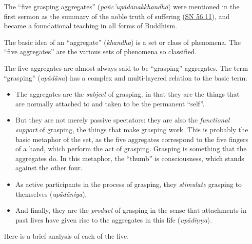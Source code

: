 \documentclass[12pt,openany]{book}%
\begin{document}
The “five grasping aggregates” (\textit{\textsanskrit{pañc}’\textsanskrit{upādānakkhandhā}}) were mentioned in the first sermon as the summary of the noble truth of suffering (\href{https://suttacentral.net/sn56.11}{SN 56.11}), and became a foundational teaching in all forms of Buddhism.

The basic idea of an “aggregate” (\textit{khandha}) is a set or class of phenomena. The “five aggregates” are the various sets of phenomena so classified.

The five aggregates are almost always said to be “grasping” aggregates. The term “grasping” (\textit{\textsanskrit{upādāna}}) has a complex and multi-layered relation to the basic term.

\begin{itemize}%
\item The aggregates are the \emph{subject} of grasping, in that they are the things that are normally attached to and taken to be the permanent “self”.%
\item But they are not merely passive spectators: they are also the \emph{functional support} of grasping, the things that make grasping work. This is probably the basic metaphor of the set, as the five aggregates correspond to the five fingers of a hand, which perform the act of grasping. Grasping is something that the aggregates do. In this metaphor, the “thumb” is consciousness, which stands against the other four.%
\item As active participants in the process of grasping, they \emph{stimulate} grasping to themselves (\textit{\textsanskrit{upādāniya}}).%
\item And finally, they are the \emph{product} of grasping in the sense that attachments in past lives have given rise to the aggregates in this life (\textit{\textsanskrit{upādiṇṇa}}).%
\end{itemize}

Here is a brief analysis of each of the five.
\end{document}
